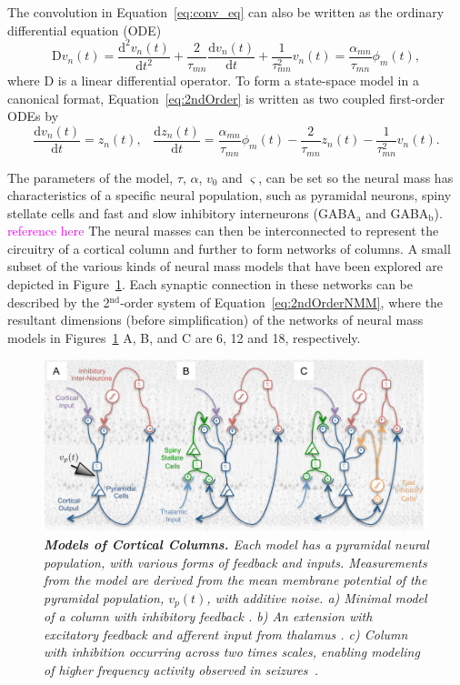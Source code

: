 \documentclass{article}
\newcommand{\unit}[1]{\textcolor{magenta}{#1}}
\begin{document}
The convolution in Equation~\ref{eq:conv_eq} can also be written as the ordinary differential equation (ODE)
\begin{equation}\label{eq:2ndOrder}
    \mathrm{D}v_n(t) = \frac{\mathrm{d}^2 v_n(t)}{\mathrm{d}t^2} + \frac{2}{\tau_{mn}}\frac{\mathrm{d} v_n(t)}{\mathrm{d}t} + \frac{1}{\tau_{mn}^2} v_n(t) = \frac{\alpha_{mn}}{\tau_{mn}} \phi_m(t),
\end{equation}
where $\mathrm{D}$ is a linear differential operator. To form a state-space model in a canonical format, Equation~\ref{eq:2ndOrder} is written as two coupled first-order ODEs by 
\begin{equation} \label{eq:2ndOrderNMM}
    \frac{\mathrm{d} v_n(t)}{\mathrm{d}t} = z_n(t),\,\,\,\,\,    \frac{\mathrm{d}z_n(t)}{\mathrm{d}t} = \frac{\alpha_{mn}}{\tau_{mn}} \phi_m(t) - \frac{2}{\tau_{mn}}z_n(t) - \frac{1}{\tau_{mn}^2} v_n(t).
\end{equation}

The parameters of the model, $\tau$, $\alpha$, $v_0$ and $\varsigma$, can be set so the neural mass has characteristics of a specific neural population, such as pyramidal neurons, spiny stellate cells and fast and slow inhibitory interneurons (GABA$_\mathrm{a}$ and GABA$_\mathrm{b}$). \unit{reference here} The neural masses can then be interconnected to represent the circuitry of a cortical column and further to form networks of columns. A small subset of the various kinds of neural mass models that have been explored \cite{Silva1974,Jansen1995,Wendling2002,David2003} are depicted in Figure~\ref{fig:NMMs}. Each synaptic connection in these networks can be described by the 2$^{\mathrm{nd}}$-order system of Equation~\ref{eq:2ndOrderNMM}, where the resultant dimensions (before simplification) of the networks of neural mass models in Figures~\ref{fig:NMMs} A, B, and C are 6, 12 and 18, respectively.
\begin{figure}[ht]
	\centering
		\includegraphics[scale=1]{./figures/pdf/NeuralMassesHoriz_plos2.pdf}
	\caption{\emph{\textbf{Models of Cortical Columns.} Each model has a pyramidal neural population, with various forms of feedback and inputs. Measurements from the model are derived from the mean membrane potential of the pyramidal population, $v_p(t)$, with additive noise.  a) Minimal model of a column with inhibitory feedback \cite{Silva1974}. b) An extension with excitatory feedback and afferent input from thalamus \cite{Jansen1995,David2003}. c) Column with inhibition occurring across two times scales, enabling modeling of higher frequency activity observed in seizures~\cite{Wendling2002}.}}
	\label{fig:NMMs}
\end{figure}
\end{document}
